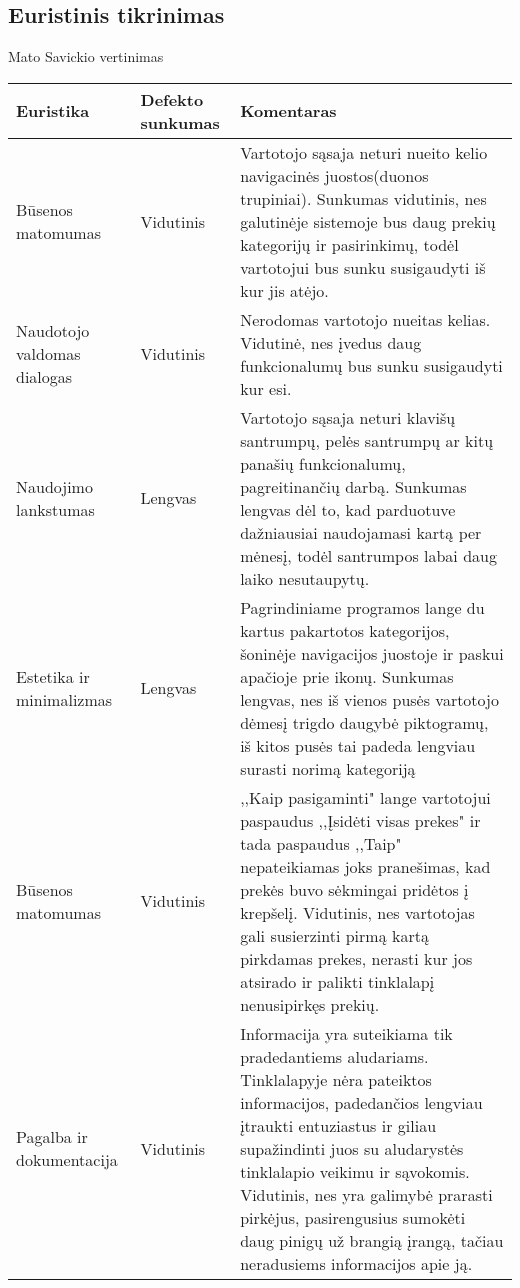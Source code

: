 \documentclass[oneside]{VUMIFPSkursinis}
\begin{document}
	\subsection{Euristinis tikrinimas}
Mato Savickio vertinimas
\begin{center}
    \begin{tabular}{ |p{3cm}| p{3cm} | p{11cm} | }
    \hline
   	 Euristika &Defekto sunkumas &Komentaras \\ \hline 
	Būsenos matomumas & Vidutinis & Vartotojo sąsaja neturi nueito kelio navigacinės juostos(duonos trupiniai). Sunkumas vidutinis, nes galutinėje sistemoje bus daug prekių kategorijų ir pasirinkimų, todėl vartotojui bus sunku susigaudyti iš kur jis atėjo. \\ \hline
	Naudotojo valdomas dialogas & Vidutinis & Nerodomas vartotojo nueitas kelias. Vidutinė, nes įvedus daug funkcionalumų bus sunku susigaudyti kur esi. \\ \hline
	Naudojimo lankstumas & Lengvas & Vartotojo sąsaja neturi klavišų santrumpų, pelės santrumpų ar kitų panašių funkcionalumų, pagreitinančių darbą.
							Sunkumas lengvas dėl to, kad parduotuve dažniausiai naudojamasi kartą per mėnesį, todėl santrumpos labai daug laiko nesutaupytų. \\ \hline
	Estetika ir minimalizmas & Lengvas & Pagrindiniame programos lange du kartus pakartotos kategorijos, šoninėje navigacijos juostoje ir paskui apačioje prie ikonų. Sunkumas lengvas, nes iš vienos pusės vartotojo dėmesį trigdo daugybė piktogramų, iš kitos pusės tai padeda lengviau surasti norimą kategoriją \\ \hline
	Būsenos matomumas & Vidutinis & ,,Kaip pasigaminti" lange vartotojui paspaudus ,,Įsidėti visas prekes" ir tada paspaudus ,,Taip" nepateikiamas joks pranešimas, kad prekės buvo sėkmingai  pridėtos į krepšelį. Vidutinis, nes vartotojas gali susierzinti pirmą kartą pirkdamas prekes, nerasti kur jos atsirado ir palikti tinklalapį nenusipirkęs prekių. \\ \hline
	Pagalba ir dokumentacija & Vidutinis & Informacija yra suteikiama tik pradedantiems aludariams.
							Tinklalapyje nėra pateiktos informacijos, padedančios lengviau įtraukti entuziastus ir giliau supažindinti juos su aludarystės tinklalapio veikimu ir sąvokomis. Vidutinis, nes yra galimybė prarasti pirkėjus, pasirengusius sumokėti daug pinigų už brangią įrangą, tačiau neradusiems informacijos apie ją. \\ \hline

	
	
   \hline
    \end{tabular}
\end{center}
\pagebreak
\end{document}
